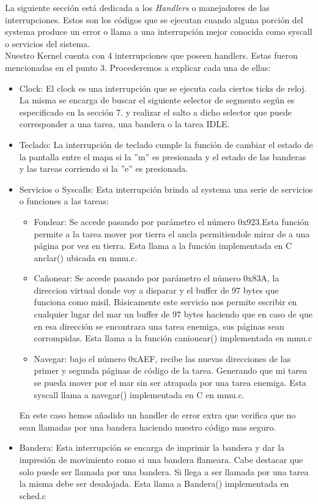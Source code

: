 La siguiente secci\'on est\'a dedicada a los \emph{Handlers} o manejadores de las interrupciones. Estos son los c\'odigos que se ejecutan
cuando alguna porci\'on del systema produce un error o llama a una interrupci\'on mejor conocida como syscall o servicios del sistema.\\
Nuestro Kernel cuenta con 4 interrupciones que poseen handlers. Estas fueron mencionadas en el punto 3. Procederemos a explicar cada una de
ellas:
\begin{itemize}
 \item Clock: El clock es una interrupci\'on que se ejecuta cada ciertos ticks de reloj. La misma se encarga de buscar el siguiente selector
de segmento según es especificado en la secci\'on 7. y realizar el salto a dicho selector que puede corresponder a una tarea, una bandera o 
la tarea IDLE.
 \item Teclado: La interrupci\'on de teclado cumple la funci\'on de cambiar el estado de la pantalla entre el mapa si la ''m'' es presionada
y el estado de las banderas y las tareas corriendo si la ''e'' es presionada.
 \item Servicios o Syscalls: Esta interrupci\'on brinda al systema una serie de servicios o funciones a las tareas:
  \begin{itemize}
   \item Fondear: Se accede pasando por par\'ametro el n\'umero 0x923.Esta funci\'on permite a la tarea mover por tierra el ancla permitiendole 
mirar de a una p\'agina por vez en tierra. Esta llama a la funci\'on implementada en C anclar() ubicada en mmu.c.
   \item Cañonear: Se accede pasando por par\'ametro el n\'umero 0x83A, la direccion virtual donde voy a disparar y el buffer de 97 bytes
que funciona como misil. B\'asicamente este servicio nos permite escribir en cualquier lugar del mar un buffer de 97 bytes haciendo que
en caso de que en esa direcci\'on se encontrara una tarea enemiga, sus p\'aginas sean corrompidas. Esta llama a la funci\'on canionear()
implementada en mmu.c
   \item Navegar: bajo el n\'umero 0xAEF, recibe las nuevas direcciones de las primer y segunda p\'aginas de c\'odigo de la tarea. Generando
que mi tarea se pueda mover por el mar sin ser atrapada por una tarea enemiga. Esta syscall llama a navegar() implementada en C en mmu.c.
  \end{itemize}
En este caso hemos añadido un handler de error extra que verifica que no sean llamadas por una bandera haciendo nuestro c\'odigo mas seguro.

 \item Bandera: Esta interrupci\'on se encarga de imprimir la bandera y dar la impresi\'on de movimiento como si una bandera flameara. Cabe 
destacar que solo puede ser llamada por una bandera. Si llega a ser llamada por una tarea la misma debe ser desalojada. Esta llama a Bandera()
implementada en sched.c
\end{itemize}

